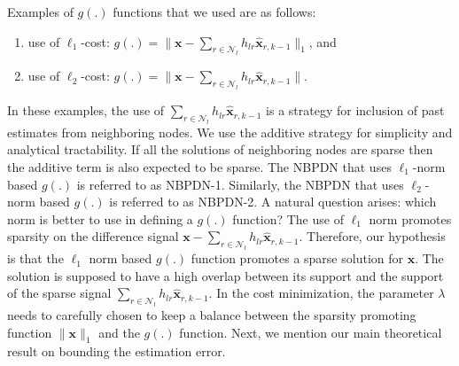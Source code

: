 \documentclass[journal]{IEEEtran}
\newcommand{\mbx}{\mathbf{x}}
\begin{document}
Examples of $g(.)$ functions that we used are as follows:
\begin{enumerate}
\item use of $\ell_1$-cost:  $g(.) = \|\mbx-\sum\limits_{r \in \mathcal{N}_l} h_{lr} \hat{\mbx}_{r,k-1}\|_1$, and
\item use of $\ell_2$-cost: $g(.) = \|\mbx-\sum\limits_{r \in \mathcal{N}_l} h_{lr} \hat{\mbx}_{r,k-1}\|$.
\end{enumerate}
In these examples, the use of $\sum\limits_{r \in \mathcal{N}_l} h_{lr} \hat{\mbx}_{r,k-1}$ is a strategy for inclusion of past estimates from neighboring nodes. We use the additive strategy for simplicity and analytical tractability. If all the solutions of neighboring nodes are sparse then the additive term is also expected to be sparse. The NBPDN that uses $\ell_1$-norm based $g(.)$ is referred to as NBPDN-1. Similarly,  the NBPDN that uses $\ell_2$-norm based $g(.)$ is referred to as NBPDN-2. A natural question arises: which norm is better to use in defining a $g(.)$ function? The use of $\ell_1$ norm promotes sparsity on the difference signal $\mbx-\sum\limits_{r \in \mathcal{N}_l} h_{lr} \hat{\mbx}_{r,k-1}$. Therefore, our hypothesis is that the $\ell_1$ norm based $g(.)$ function promotes a sparse solution for $\mbx$. The solution is supposed to have a high overlap between its support and the support of the sparse signal $\sum\limits_{r \in \mathcal{N}_l} h_{lr} \hat{\mbx}_{r,k-1}$. In the cost minimization, the parameter $\lambda$ needs to carefully chosen to keep a balance between the sparsity promoting function $\| \mbx \|_1$ and the $g(.)$ function. Next, we mention our main theoretical result on bounding the estimation error. 
\end{document}
